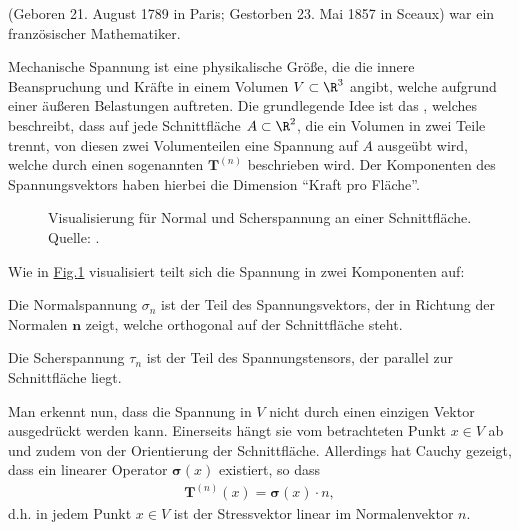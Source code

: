 \documentclass[letterpaper,10pt,english]{jupyterBook}
\let\sphinxpxdimen\pdfpxdimen\else\newdimen\sphinxpxdimen
\begin{document}
\begin{sphinxShadowBox}

\sphinxAtStartPar
{} (Geboren 21. August 1789 in Paris; Gestorben 23. Mai 1857 in Sceaux) war ein französischer Mathematiker.
\end{sphinxShadowBox}

\sphinxAtStartPar
Mechanische Spannung ist eine physikalische Größe, die die innere Beanspruchung und Kräfte in einem Volumen \(V\subset\R^3\) angibt, welche aufgrund einer äußeren Belastungen auftreten.
Die grundlegende Idee ist das , welches beschreibt, dass auf jede Schnittfläche \(A\subset\R^2\), die ein Volumen in zwei Teile trennt, von diesen zwei Volumenteilen eine Spannung auf \(A\) ausgeübt wird, welche durch einen sogenannten  \(\mathbf{T}^{(n)}\) beschrieben wird.
Der Komponenten des Spannungsvektors haben hierbei die Dimension “Kraft pro Fläche”.

\begin{figure}[htbp]
\centering
\capstart

\noindent\sphinxincludegraphics[height=250\sphinxpxdimen]{{stress_vector}.png}
\caption{Visualisierung für Normal\sphinxhyphen{} und Scherspannung an einer Schnittfläche. Quelle: .}\label{\detokenize{vektoranalysis/tensor:fig-stress}}\end{figure}

\sphinxAtStartPar
Wie in \hyperref[\detokenize{vektoranalysis/tensor:fig-stress}]{Fig.\@ \ref{\detokenize{vektoranalysis/tensor:fig-stress}}} visualisiert teilt sich die Spannung in zwei Komponenten auf:

\sphinxAtStartPar
{}

\sphinxAtStartPar
Die Normalspannung \(\sigma_n\) ist der Teil des Spannungsvektors, der in Richtung der Normalen \(\mathbf{n}\) zeigt, welche orthogonal auf der Schnittfläche steht.

\sphinxAtStartPar
{}

\sphinxAtStartPar
Die Scherspannung \(\tau_n\) ist der Teil des Spannungstensors, der parallel zur Schnittfläche liegt.

\sphinxAtStartPar
Man erkennt nun, dass die Spannung in \(V\) nicht durch einen einzigen Vektor ausgedrückt werden kann. Einerseits hängt sie vom betrachteten Punkt \(x\in V\) ab und zudem von der Orientierung der Schnittfläche. Allerdings hat Cauchy gezeigt, dass ein linearer Operator \(\mathbf{\sigma}(x)\) existiert, so dass
\begin{equation*}
\begin{split}\mathbf{T}^{(n)}(x) = \mathbf{\sigma}(x) \cdot n,\end{split}
\end{equation*}
\sphinxAtStartPar
d.h. in jedem Punkt \(x\in V\) ist der Stressvektor linear im Normalenvektor \(n\).
\end{document}
